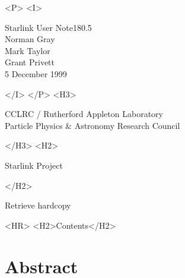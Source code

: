 \documentclass[twoside,11pt]{article}
\newcommand{\stardoccategory}  {Starlink User Note}
\newcommand{\stardocsource}    {sun\stardocnumber}
\newcommand{\stardocnumber}    {180.5}
\newcommand{\stardocauthors}   {Norman Gray\\Mark Taylor\\Grant Privett}
\newcommand{\stardocdate}      {5 December 1999}
\newcommand{\htmladdnormallink}[2]{#1}
\newcommand{\htmladdimg}[1]{}
\newcommand{\htmlref}[2]{#1}
\newcommand{\htmladdtonavigation}[1]{}
\newcommand{\xlabel}[1]{}
\newcommand{\latexonlytoc}[0]{\tableofcontents}
\begin{document}
\begin{htmlonly}
   \begin{rawhtml} <P> <I> \end{rawhtml}
   \stardoccategory \stardocnumber \\
   \stardocauthors \\
   \stardocdate
   \begin{rawhtml} </I> </P> <H3> \end{rawhtml}
      \htmladdnormallink{CCLRC}{http://www.cclrc.ac.uk} /
      \htmladdnormallink{Rutherford Appleton Laboratory}
                        {http://www.cclrc.ac.uk/ral} \\
      \htmladdnormallink{Particle Physics \& Astronomy Research Council}
                        {http://www.pparc.ac.uk} \\
   \begin{rawhtml} </H3> <H2> \end{rawhtml}
      \htmladdnormallink{Starlink Project}{http://star-www.rl.ac.uk/}
   \begin{rawhtml} </H2> \end{rawhtml}
   \htmladdnormallink{\htmladdimg{source.gif} Retrieve hardcopy}
      {http://star-www.rl.ac.uk/cgi-bin/hcserver?\stardocsource}\\

  \label{stardoccontents}
  \begin{rawhtml}
    <HR>
    <H2>Contents</H2>
  \end{rawhtml}
  \renewcommand{\latexonlytoc}[0]{}
  \htmladdtonavigation{\htmlref{\htmladdimg{contents_motif.gif}}
        {stardoccontents}}

  \section{\xlabel{abstract}Abstract}
\end{htmlonly}
\end{document}
